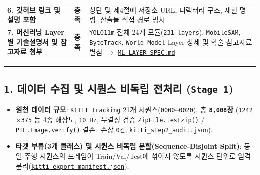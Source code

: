 \documentclass[10.5pt,a4paper]{article}
\begin{document}
\begin{footnotesize}
\begin{longtable}{>{\raggedright\arraybackslash}p{} >{\raggedright\arraybackslash}p{} >{\raggedright\arraybackslash}p{}}
\textbf{6. 깃허브 링크 및 설명 포함} & \textbf{충족} & 상단 및 제4절에 저장소 URL, 디렉터리 구조, 재현 명령, 산출물 직접 경로 명시 \\
\textbf{7. 머신러닝 Layer별 기술설명서 및 참고자료 첨부} & \textbf{충족} & \texttt{YOLO11m} 전체 24개 모듈(\texttt{231 layers}), \texttt{MobileSAM}, \texttt{ByteTrack}, \texttt{World Model} Layer 상세 및 학술 참고자료 별첨 $\rightarrow$ \href{https://github.com/Heisnotanimposter/Totalcare\_autonomous\_driving\_Yolov5/blob/main/ML\_LAYER\_SPEC.md}{\texttt{ML\_\allowbreak{}LAYER\_\allowbreak{}SPEC.\allowbreak{}md}} \\
\end{longtable}
\end{footnotesize}


\par\noindent\rule{\textwidth}{0.4pt}\par\medskip

\subsection{1. 데이터 수집 및 시퀀스 비독립 전처리 (\texttt{Stage 1})}

\begin{itemize}[leftmargin=1.5em,itemsep=2pt]
\item \textbf{원천 데이터 규모}: \texttt{KITTI Tracking} 21개 시퀀스(\texttt{0000}\textasciitilde{}\texttt{0020}), 총 \textbf{\texttt{8,\allowbreak{}008}장} (\texttt{1242$\times$375} 등 4종 해상도, \texttt{10 Hz}, 무결성 검증 \texttt{ZipFile.\allowbreak{}testzip()} / \texttt{PIL.\allowbreak{}Image.\allowbreak{}verify()} 결손·손상 \texttt{0건}, \href{https://github.com/Heisnotanimposter/Totalcare\_autonomous\_driving\_Yolov5/blob/main/results/v2\_improved/outputs/kitti\_step2\_audit.json}{\texttt{kitti\_\allowbreak{}step2\_\allowbreak{}audit.\allowbreak{}json}}).
\item \textbf{타겟 부류(3개 클래스) 및 시퀀스 비독립 분할(Sequence-Disjoint Split)}: 동일 주행 시퀀스의 프레임이 Train/Val/Test에 섞이지 않도록 시퀀스 단위로 엄격 분리(\href{https://github.com/Heisnotanimposter/Totalcare\_autonomous\_driving\_Yolov5/blob/main/results/v2\_improved/outputs/kitti\_export\_manifest.json}{\texttt{kitti\_\allowbreak{}export\_\allowbreak{}manifest.\allowbreak{}json}}).
\end{itemize}
\end{document}

